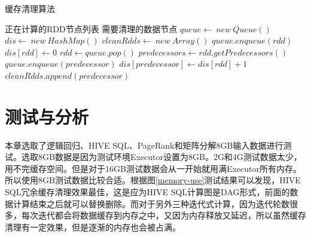 \begin{algorithm}  
    \caption{缓存清理算法}  
    \begin{algorithmic}[1] %
        \Require 正在计算的RDD节点列表
        \Ensure 需要清理的数据节点
            \State $queue \gets \ new \ Queue()$
            \State $dis \gets  \ new \ HashMap()$
            \State $cleanRdds \gets \ new \ Array()$
                \State $queue.enqueue(rdd)$
                \State $dis[rdd] \gets 0$
            \EndFor
                \State $rdd \gets queue.pop()$
                \State $predecessors \gets rdd.getPredecessors()$
                    \State $queue.enqueue(predecessor)$
                    \State $dis[predecessor] \gets dis[rdd]+1$
                        $cleanRdds.append(predecessor)$
                    \EndIf
                \EndFor
            \EndWhile
        \EndFunction
    \end{algorithmic}
    \label{alg:cal-dis}
\end{algorithm}

\section{测试与分析}

本章选取了逻辑回归、HIVE SQL、PageRank和矩阵分解8GB输入数据进行测试。选取8GB数据是因为测试环境Executor设置为8GB。2G和4G测试数据太少，用不完缓存空间。但是对于16GB测试数据会从一开始就用满Executor所有内存。所以使用8GB测试数据比较合适。根据图\ref{memory-use}测试结果可以发现，HIVE SQL冗余缓存清理效果最佳，这是应为HIVE SQL计算图是DAG形式，前面的数据计算结束之后就可以替换删除。而对于另外三种迭代式计算，因为迭代轮数很多，每次迭代都会将数据缓存到内存之中，又因为内存释放又延迟，所以虽然缓存清理有一定效果，但是逐渐的内存也会被占满。

